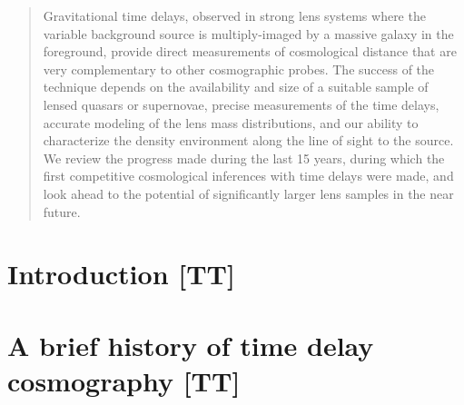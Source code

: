 \date{Received: date / Accepted: date}

\maketitle


\begin{abstract}

Gravitational time delays, observed in strong lens systems where the
variable background source is multiply-imaged by a  massive galaxy in
the foreground, provide direct measurements of cosmological distance
that are very complementary to other cosmographic probes. The success of
the technique depends on the availability and size of a suitable sample
of lensed quasars or supernovae, precise measurements of the time
delays, accurate modeling of the lens mass distributions, and our
ability to characterize the density environment along the line of sight
to the source. We review the progress made during the last 15 years,
during which the first competitive cosmological inferences with time
delays were made, and look ahead to the potential of significantly
larger lens samples in the near future.



\end{abstract}


\section{Introduction [TT]}
\label{sec:intro}




\section{A brief history of time delay cosmography [TT]}
\label{sec:history}

